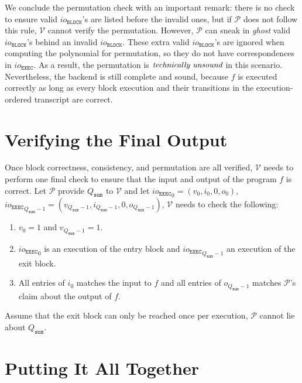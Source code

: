 \documentclass{article}
\newcommand{\Qsum}{Q_{\mathtt{sum}}}
\renewcommand{\P}{\mathcal{P}}
\newcommand{\V}{\mathcal{V}}
\newcommand{\iob}{io_{\mathtt{BLOCK}}}
\newcommand{\ioe}{io_{\mathtt{EXEC}}}
\begin{document}
We conclude the permutation check with an important remark: there is no check to ensure valid $\iob$'s are listed before the invalid ones, but if $\P$ does not follow this rule, $\V$ cannot verify the permutation. However, $\P$ can sneak in \emph{ghost} valid $\iob$'s behind an invalid $\iob$. These extra valid $\iob$'s are ignored when computing the polynomial for permutation, so they do not have correspondences in $\ioe$. As a result, the permutation is $\emph{technically unsound}$ in this scenario. Nevertheless, the backend is still complete and sound, because $f$ is executed correctly as long as every block execution and their transitions in the execution-ordered transcript are correct.


\section{Verifying the Final Output}\label{sec:final_output}

Once block correctness, consistency, and permutation are all verified, $\V$ needs to perform one final check to ensure that the input and output of the program $f$ is correct. Let $\P$ provide $\Qsum$ to $\V$ and let ${\ioe}_0 = (v_0, i_0, 0, o_0)$, ${\ioe}_{\Qsum - 1} = (v_{\Qsum - 1}, i_{\Qsum - 1}, 0, o_{\Qsum - 1})$, $\V$ needs to check the following:
\begin{enumerate}
    \item $v_0 = 1$ and $v_{\Qsum - 1} = 1$.
    \item ${\ioe}_0$ is an execution of the entry block and ${\ioe}_{\Qsum - 1}$ an execution of the exit block.
    \item All entries of $i_0$ matches the input to $f$ and all entries of $o_{\Qsum - 1}$ matches $\P$'s claim about the output of $f$.
\end{enumerate}
Assume that the exit block can only be reached once per execution, $\P$ cannot lie about $\Qsum$.


\section{Putting It All Together}\label{sec:summary}
\end{document}
